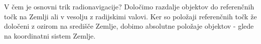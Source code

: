 %
%
%




 
V čem je osnovni trik radionavigacije? Določimo razdalje objektov do referenčnih točk na Zemlji ali v vesolju z radijskimi valovi. Ker so položaji referenčnih točk že določeni z ozirom na središče Zemlje, dobimo absolutne položaje objektov - glede na koordinatni sistem Zemlje.   

